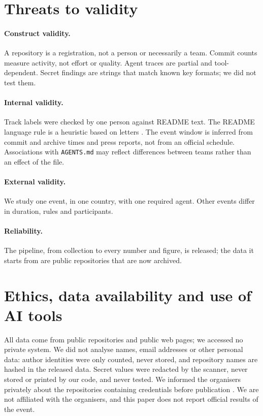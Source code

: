 \documentclass{article}
\begin{document}
\section{Threats to validity}\label{sec:threats}

\paragraph{Construct validity.}
A repository is a registration, not a person or necessarily a team. Commit counts measure activity, not effort or quality. Agent traces are partial and tool-dependent. Secret findings are strings that match known key formats; we did not test them.

\paragraph{Internal validity.}
Track labels were checked by one person against README text. The README language rule is a heuristic based on letters . The event window is inferred from commit and archive times and press reports, not from an official schedule. Associations with \texttt{AGENTS.md} may reflect differences between teams rather than an effect of the file.

\paragraph{External validity.}
We study one event, in one country, with one required agent. Other events differ in duration, rules and participants.

\paragraph{Reliability.}
The pipeline, from collection to every number and figure, is released; the data it starts from are public repositories that are now archived.

\section{Ethics, data availability and use of AI tools}\label{sec:ethics}

All data come from public repositories and public web pages; we accessed no private system. We did not analyse names, email addresses or other personal data: author identities were only counted, never stored, and repository names are hashed in the released data. Secret values were redacted by the scanner, never stored or printed by our code, and never tested. We informed the organisers privately about the repositories containing credentials before publication . We are not affiliated with the organisers, and this paper does not report official results of the event.
\end{document}
